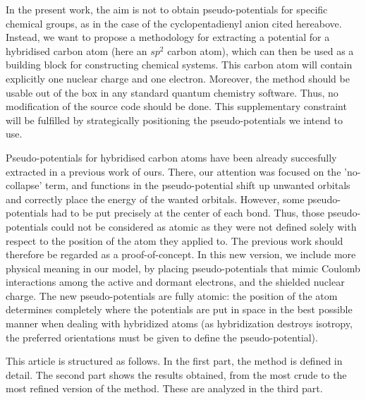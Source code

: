 \documentclass[journal=jctcce,manuscript=article]{achemso}
\begin{document}

In the present work, the aim is not to obtain pseudo-potentials for  specific
chemical groups, as in the case of the cyclopentadienyl anion cited hereabove.
Instead, we want to propose a methodology for extracting a potential for
a hybridised carbon atom (here an $sp^2$ carbon atom), which can then be
used as a building block for constructing chemical systems. This carbon atom
will contain explicitly one nuclear charge and one electron.
Moreover, the method should be usable 
out of the box in any standard quantum chemistry software.
Thus, no modification of the source code should be done.
This supplementary constraint will be fulfilled by strategically positioning the pseudo-potentials
we intend to use. 

Pseudo-potentials for hybridised carbon
atoms have been already succesfully extracted in a previous work of ours.\cite{drujon_pseudopotentials_2013}
There, our attention was focused on the 'no-collapse' term, and 
functions in the pseudo-potential shift up unwanted orbitals and correctly place the energy of the
wanted orbitals.
However, some pseudo-potentials had to be put precisely at the center
of each bond.
Thus, those pseudo-potentials could not be considered as atomic as they were not defined solely
with respect to the position of the atom they applied to. The previous work should therefore be regarded as a proof-of-concept.
In this new version, we include more physical meaning in our model, 
by placing pseudo-potentials that mimic Coulomb interactions among the active and dormant electrons, and the shielded nuclear charge. 
The new pseudo-potentials are fully atomic: the position of the atom
determines completely where the potentials are put in space in the best possible manner
when dealing with hybridized atoms (as hybridization destroys isotropy, the preferred orientations
must be given to define the pseudo-potential).

This article is structured as follows.
In the first part, the method is defined in detail.
The second part shows the results obtained, from the most crude to the most refined
version of the method.
These are analyzed in the third part.
\end{document}
